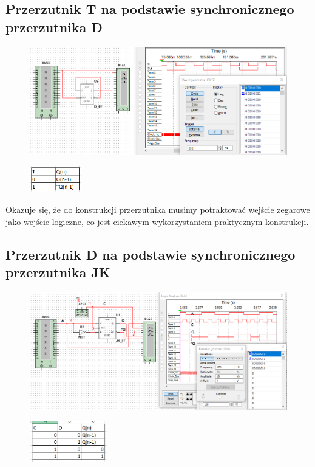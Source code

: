 \documentclass[12pt,a4paper]{article}
\begin{document}
\subsection{Przerzutnik T na podstawie synchronicznego przerzutnika D}
\begin{figure}[H]
\centering
\includegraphics[width=\textwidth]{img/3e}
\end{figure}
\begin{figure}[H]
\centering
\includegraphics[width=0.2\textwidth]{img/3eTruthTable}
\end{figure}

Okazuje się, że do konstrukcji przerzutnika musimy potraktować wejście zegarowe jako wejście logiczne, co jest ciekawym wykorzystaniem praktycznym konstrukcji.

\newpage
\subsection{Przerzutnik D na podstawie synchronicznego przerzutnika JK}
\begin{figure}[H]
\centering
\includegraphics[width=\textwidth]{img/3f}
\end{figure}
\begin{figure}[H]
\centering
\includegraphics[width=0.3\textwidth]{img/3dTruthTable}
\end{figure}
\end{document}
